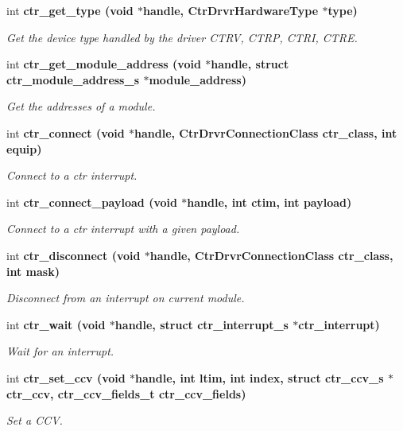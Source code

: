 \begin{CompactItemize}
int \bf{ctr\_\-get\_\-type} (void $\ast$handle, Ctr\-Drvr\-Hardware\-Type $\ast$type)
\begin{CompactList}\small\item\em Get the device type handled by the driver CTRV, CTRP, CTRI, CTRE. \item\end{CompactList}\item 
int \bf{ctr\_\-get\_\-module\_\-address} (void $\ast$handle, struct \bf{ctr\_\-module\_\-address\_\-s} $\ast$module\_\-address)
\begin{CompactList}\small\item\em Get the addresses of a module. \item\end{CompactList}\item 
int \bf{ctr\_\-connect} (void $\ast$handle, Ctr\-Drvr\-Connection\-Class ctr\_\-class, int equip)
\begin{CompactList}\small\item\em Connect to a ctr interrupt. \item\end{CompactList}\item 
int \bf{ctr\_\-connect\_\-payload} (void $\ast$handle, int ctim, int payload)
\begin{CompactList}\small\item\em Connect to a ctr interrupt with a given payload. \item\end{CompactList}\item 
int \bf{ctr\_\-disconnect} (void $\ast$handle, Ctr\-Drvr\-Connection\-Class ctr\_\-class, int mask)
\begin{CompactList}\small\item\em Disconnect from an interrupt on current module. \item\end{CompactList}\item 
int \bf{ctr\_\-wait} (void $\ast$handle, struct \bf{ctr\_\-interrupt\_\-s} $\ast$ctr\_\-interrupt)
\begin{CompactList}\small\item\em Wait for an interrupt. \item\end{CompactList}\item 
int \bf{ctr\_\-set\_\-ccv} (void $\ast$handle, int ltim, int index, struct \bf{ctr\_\-ccv\_\-s} $\ast$ctr\_\-ccv, \bf{ctr\_\-ccv\_\-fields\_\-t} ctr\_\-ccv\_\-fields)
\begin{CompactList}\small\item\em Set a CCV. \item\end{CompactList}\item 

\end{CompactItemize}
